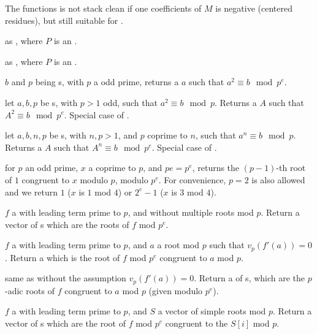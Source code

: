 The functions is not stack clean if one coefficients of $M$ is negative
(centered residues), but still suitable for .

 as
, where $P$ is an .

 as
, where $P$ is an .


 $b$ and $p$ being s, with $p$
a odd prime, returns a  $a$ such that $a^2 \equiv b \mod p^e$.

 let
$a,b,p$ be s, with $p > 1$ odd, such that $a^2\equiv b\mod p$.
Returns a  $A$ such that $A^2 \equiv b \mod p^e$. Special case
of .

 let
$a,b,n,p$ be s, with $n,p > 1$, and $p$ coprime to $n$,
such that $a^n \equiv b \mod p$. Returns a  $A$ such that
$A^n \equiv b \mod p^e$. Special case of .

 for $p$ an odd prime,
$x$ a  coprime to $p$, and $pe = p^e$, returns the $(p-1)$-th root of
$1$ congruent to $x$ modulo $p$, modulo $p^e$. For convenience, $p = 2$ is
also allowed and we return $1$ ($x$ is $1$ mod $4$) or $2^e - 1$ ($x$ is $3$
mod $4$).


 $f$ a  with leading
term prime to $p$, and without multiple roots mod $p$. Return a vector
of s which are the roots of $f$ mod $p^e$.

 $f$ a  with
leading term prime to $p$, and $a$ a root mod $p$ such that
$v_p(f'(a))=0$.  Return a  which is the root of $f$ mod $p^e$
congruent to $a$ mod $p$.

 same as 
without the assumption $v_p(f'(a)) = 0$. Return a  of s,
which are the $p$-adic roots of $f$ congruent to $a$ mod $p$ (given modulo
$p^e$).

 $f$ a  with
leading term prime to $p$, and $S$ a vector of simple roots mod $p$. Return a
vector of s which are the root of $f$ mod $p^e$ congruent to the
$S[i]$ mod $p$.

